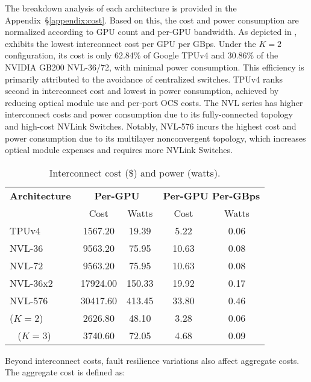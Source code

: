 The breakdown analysis of each architecture is provided in the Appendix~\S\ref{appendix:cost}. Based on this, the cost and power consumption are normalized according to GPU count and per-GPU bandwidth. As depicted in , \sys{} exhibits the lowest interconnect cost per GPU per GBps. Under the $K =2$ configuration, its cost is only 62.84\% of Google TPUv4 and 30.86\% of the NVIDIA GB200 NVL-36/72, with minimal power consumption.
This efficiency is primarily attributed to the avoidance of centralized switches. TPUv4 ranks second in interconnect cost and lowest in power consumption, achieved by reducing optical module use and per-port OCS costs. The NVL series has higher interconnect costs and power consumption due to its fully-connected topology and high-cost NVLink Switches. Notably, NVL-576 incurs the highest cost and power consumption due to its multilayer nonconvergent topology, which increases optical module expenses and requires more NVLink Switches.

\begin{table}[h!t] \footnotesize
    \vspace{-3ex}
    \centering
    \begin{tabular}{lcccc}
    \toprule
    \textbf{Architecture}  & \multicolumn{2}{c}{\textbf{Per-GPU}}  & \multicolumn{2}{c}{\textbf{Per-GPU Per-GBps}} \\
 &  Cost & Watts & Cost & Watts \\
    \midrule
    TPUv4  & 1567.20  & 19.39 & 5.22& 0.06 \\
    NVL-36  & 9563.20  & 75.95 & 10.63& 0.08 \\
    NVL-72  & 9563.20  & 75.95 & 10.63 & 0.08 \\
    NVL-36x2  & 17924.00  & 150.33 & 19.92  & 0.17\\
    NVL-576   & 30417.60  & 413.45 & 33.80  & 0.46\\
    \midrule
    \SYS{} ($K=2$) &  2626.80 &  48.10 & 3.28  & 0.06\\\
    \SYS{} ($K=3$) &  3740.60 &  72.05  & 4.68  & 0.09\\
    \bottomrule
    \end{tabular}
    \caption{Interconnect cost (\$) and power (watts).}
    \label{tab:eval:cost-power}
    \vspace{-6ex}
\end{table}


Beyond interconnect costs, fault resilience variations also affect aggregate costs. The aggregate cost is defined as:

